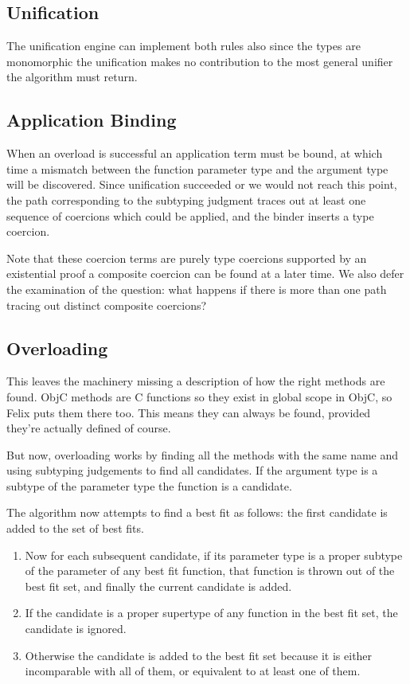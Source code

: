 \documentclass[oneside]{book}
\begin{document}
\subsection{Unification}
The unification engine can implement both rules also since the types are 
monomorphic the unification makes no contribution to the most general unifier
the algorithm must return.

\subsection{Application Binding}
When an overload is successful an application term must be bound, at which
time a mismatch between the function parameter type and the argument
type will be discovered. Since unification succeeded or we would not
reach this point, the path corresponding to the subtyping judgment
traces out at least one sequence of coercions which could be applied,
and the binder inserts a type coercion.

Note that these coercion terms are purely type coercions supported 
by an existential proof a composite coercion can be found at a later time.
We also defer the examination of the question: what happens if there
is more than one path tracing out distinct composite coercions?

\subsection{Overloading}
This leaves the machinery missing a description of how the right
methods are found. ObjC methods are C functions so they exist in
global scope in ObjC, so Felix puts them there too. This means
they can always be found, provided they're actually defined of course.

But now, overloading works by finding all the methods with the same
name and using subtyping judgements to find all candidates. If the argument
type is a subtype of the parameter type the function is a candidate.

The algorithm now attempts to find a best fit as follows: the first
candidate is added to the set of best fits. 
\begin{enumerate}
\item Now for each subsequent 
candidate, if its parameter type is a proper subtype of the parameter 
of any best fit function, that function is thrown out of the best fit set, 
and finally the current candidate is added. 

\item If the candidate is a proper supertype of any function
in the best fit set, the candidate is ignored. 

\item Otherwise the candidate is
added to the best fit set because it is either incomparable with all of them,
or equivalent to at least one of them.
\end{enumerate}
\end{document}
